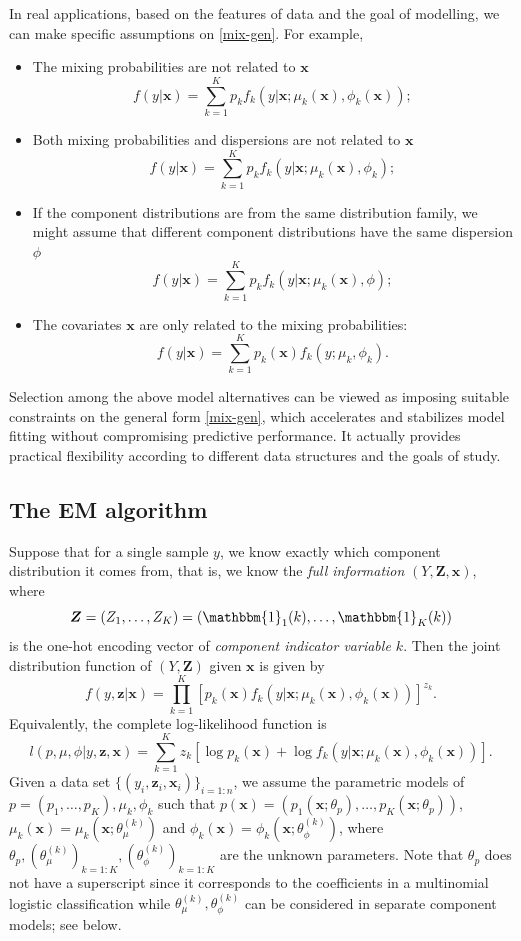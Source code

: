 \documentclass[11pt]{article}
\numberwithin{equation}{section}
\def\bx{\boldsymbol{x}}
\def\bZ{\boldsymbol{Z}}
\def\bz{\boldsymbol{z}}
\begin{document}
	 In real applications,  based on the features of data and the goal of modelling, we can make specific assumptions on \eqref{mix-gen}. For example,
	\begin{itemize}
		\item The mixing probabilities are not related to $\bx$
		$$f(y|\bx)=\sum_{k=1}^Kp_kf_k(y|\bx;\mu_k(\bx),\phi_k(\bx));$$
		\item Both mixing probabilities and dispersions are not related to $\bx$
		$$f(y|\bx)=\sum_{k=1}^Kp_kf_k(y|\bx;\mu_k(\bx),\phi_k);$$

		\item If the component distributions are from the same distribution family, we might assume that different component distributions have the same dispersion $\phi$
		$$f(y|\bx)=\sum_{k=1}^Kp_kf_k(y|\bx;\mu_k(\bx),\phi);$$
		\item The covariates $\bx$ are only related to the mixing probabilities:
		$$f(y|\bx)=\sum_{k=1}^Kp_k(\bx)f_k(y;\mu_k,\phi_k).$$
	\end{itemize}
	Selection among the above model alternatives can be viewed as imposing suitable constraints on the general form \eqref{mix-gen}, which accelerates and stabilizes model fitting without compromising predictive performance. It actually provides practical flexibility according to different data structures and the goals of study.

\subsection{The EM algorithm}

	Suppose that for a single sample $y$, we know exactly which component distribution it comes from, that is, we know the \textit{full information} $(Y,\bZ,\bx)$, where
	$$\bZ=(Z_1,\ldots,Z_K)=(\mathbbm{1}_1(k),\ldots,\mathbbm{1}_K(k))$$
	is the one-hot encoding vector of \textit{component indicator variable $k$}.
	Then the joint distribution function of $(Y,\bZ)$ given $\bx$ is given by
	$$f(y,\bz|
	\bx) = \prod_{k=1}^K\left[p_k(\bx)f_k(y|\bx;\mu_k(\bx),\phi_k(\bx))\right]^{z_k}.$$
	Equivalently, the {complete log-likelihood function} is 
	\begin{equation}\label{full-L}
		l(p,\mu,\phi|y,\bz,\bx)=\sum_{k=1}^K z_k\left[\log p_k(\bx) + \log f_k(y|\bx;\mu_k(\bx),\phi_k(\bx))\right].
	\end{equation}
	 Given a data set $\{(y_i,\bz_i,\bx_i)\}_{i=1:n}$, we assume the parametric models of $p=(p_1,\ldots,p_K),\mu_k,\phi_k$ such that $p(\bx)=(p_1(\bx;\theta_p),\ldots,p_K(\bx;\theta_p))$, $\mu_k(\bx)=\mu_k(\bx;\theta_\mu^{(k)})$ and $\phi_k(\bx)=\phi_k(\bx;\theta_\phi^{(k)})$, where $\theta_p, (\theta_\mu^{(k)})_{k=1:K}, (\theta_\phi^{(k)})_{k=1:K}$ are the unknown parameters. Note that $\theta_p$ does not have a superscript since it corresponds to the coefficients in a multinomial logistic classification while $\theta_\mu^{(k)},\theta_\phi^{(k)}$ can be considered in separate component models; see below.
	 
\end{document}
